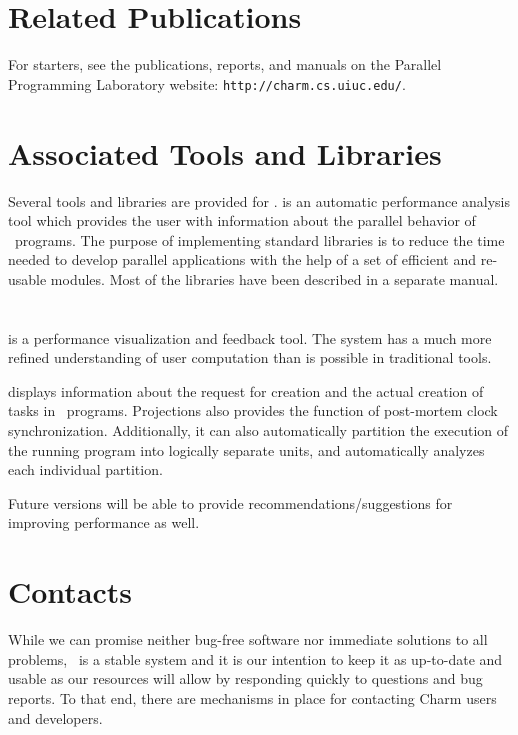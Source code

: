 \section{Related Publications}
\label{publications}

For starters, see the publications, reports, and manuals 
on the Parallel Programming Laboratory website: \texttt{http://charm.cs.uiuc.edu/}. 

\section{Associated Tools and Libraries}

Several tools and libraries are provided for \charmpp{}. \projections{} 
is an automatic performance analysis tool which provides
the user with information about the parallel behavior of \charmpp\ programs. 
The purpose of implementing \charmpp{} standard
libraries is to reduce the time needed to develop parallel
applications with the help of a set of efficient and re-usable modules.
Most of the libraries have been described in a separate manual.

\section{\projections}

\projections{} is a performance visualization and feedback tool. The system has
a much more refined understanding of user computation than is possible in
traditional tools.

\projections{} displays information about the request for creation and the
actual creation of tasks in \charmpp\ programs. Projections also provides the
function of post-mortem clock synchronization. Additionally, it can also
automatically partition the execution of the running program into logically
separate units, and automatically analyzes each individual partition. 

Future versions will be able to provide recommendations/suggestions for
improving performance as well.

\section{Contacts}
\label{Distribution}

While we can promise neither bug-free software nor immediate solutions   
to all problems, \charmpp\ is a stable system and it is our intention to
keep it as up-to-date and usable as our resources will allow
by responding quickly to questions and bug reports.  To that
end, there are mechanisms in place for contacting Charm users
and developers. 

